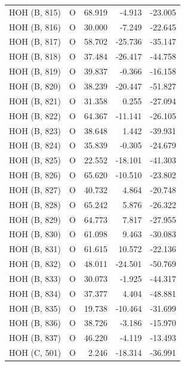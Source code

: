 \begin{longtable}{@{}lcrr@{}}
  \cmidrule(r){1-5}
  HOH (B, 815) & O & 68.919 & -4.913 & -23.005 \\
  \cmidrule(r){1-5}
  HOH (B, 816) & O & 30.000 & -7.249 & -22.645 \\
  \cmidrule(r){1-5}
  HOH (B, 817) & O & 58.702 & -25.736 & -35.147 \\
  \cmidrule(r){1-5}
  HOH (B, 818) & O & 37.484 & -26.417 & -44.758 \\
  \cmidrule(r){1-5}
  HOH (B, 819) & O & 39.837 & -0.366 & -16.158 \\
  \cmidrule(r){1-5}
  HOH (B, 820) & O & 38.239 & -20.447 & -51.827 \\
  \cmidrule(r){1-5}
  HOH (B, 821) & O & 31.358 & 0.255 & -27.094 \\
  \cmidrule(r){1-5}
  HOH (B, 822) & O & 64.367 & -11.141 & -26.105 \\
  \cmidrule(r){1-5}
  HOH (B, 823) & O & 38.648 & 1.442 & -39.931 \\
  \cmidrule(r){1-5}
  HOH (B, 824) & O & 35.839 & -0.305 & -24.679 \\
  \cmidrule(r){1-5}
  HOH (B, 825) & O & 22.552 & -18.101 & -41.303 \\
  \cmidrule(r){1-5}
  HOH (B, 826) & O & 65.620 & -10.510 & -23.802 \\
  \cmidrule(r){1-5}
  HOH (B, 827) & O & 40.732 & 4.864 & -20.748 \\
  \cmidrule(r){1-5}
  HOH (B, 828) & O & 65.242 & 5.876 & -26.322 \\
  \cmidrule(r){1-5}
  HOH (B, 829) & O & 64.773 & 7.817 & -27.955 \\
  \cmidrule(r){1-5}
  HOH (B, 830) & O & 61.098 & 9.463 & -30.083 \\
  \cmidrule(r){1-5}
  HOH (B, 831) & O & 61.615 & 10.572 & -22.136 \\
  \cmidrule(r){1-5}
  HOH (B, 832) & O & 48.011 & -24.501 & -50.769 \\
  \cmidrule(r){1-5}
  HOH (B, 833) & O & 30.073 & -1.925 & -44.317 \\
  \cmidrule(r){1-5}
  HOH (B, 834) & O & 37.377 & 4.404 & -48.881 \\
  \cmidrule(r){1-5}
  HOH (B, 835) & O & 19.738 & -10.464 & -31.699 \\
  \cmidrule(r){1-5}
  HOH (B, 836) & O & 38.726 & -3.186 & -15.970 \\
  \cmidrule(r){1-5}
  HOH (B, 837) & O & 46.220 & -4.119 & -13.493 \\
  \cmidrule(r){1-5}
  HOH (C, 501) & O & 2.246 & -18.314 & -36.991 \\

\end{longtable}
